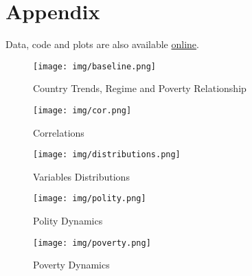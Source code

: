 \documentclass[a4paper, 12pt]{article}
\begin{document}
    
\printbibliography


\section*{Appendix}
\FloatBarrier
\noindent Data, code and plots are also available \href{https://github.com/valdewastaken/MSA}{online}.

\begin{figure}
    \centering
    \texttt{[image: img/baseline.png]}
    \caption{Country Trends, Regime and Poverty Relationship}
    \label{corr}
\end{figure}

\begin{figure}
    \centering
    \texttt{[image: img/cor.png]}
    \caption{Correlations}
    \label{corr}
\end{figure}


\begin{landscape}
\begin{figure}
    \centering
    \texttt{[image: img/distributions.png]}
    \caption{Variables Distributions}
    \label{distr}
\end{figure}
\end{landscape}

\begin{figure}
    \centering
    \texttt{[image: img/polity.png]}
    \caption{Polity Dynamics}
    \label{pol}
\end{figure}

\begin{figure}
    \centering
    \texttt{[image: img/poverty.png]}
    \caption{Poverty Dynamics}
    \label{pov}
\end{figure}
\end{document}
